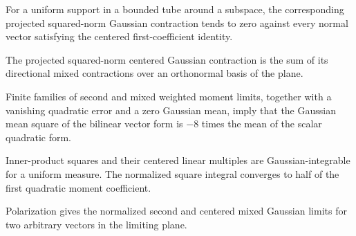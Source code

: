 \begin{lemma}
\label{lem:bounded-tube-projected-contraction}

For a uniform support in a bounded tube around a subspace, the corresponding projected squared-norm Gaussian contraction tends to zero against every normal vector satisfying the centered first-coefficient identity.
\end{lemma}

\begin{lemma}
\label{lem:projected-mixed-gaussian-sum}

The projected squared-norm centered Gaussian contraction is the sum of its directional mixed contractions over an orthonormal basis of the plane.
\end{lemma}

\begin{lemma}
\label{lem:gaussian-weighted-contraction}

Finite families of second and mixed weighted moment limits, together with a vanishing quadratic error and a zero Gaussian mean, imply that the Gaussian mean square of the bilinear vector form is $-8$ times the mean of the scalar quadratic form.
\end{lemma}

\begin{lemma}
\label{lem:gaussian-inner-product-limits}

Inner-product squares and their centered linear multiples are Gaussian-integrable for a uniform measure. The normalized square integral converges to half of the first quadratic moment coefficient.
\end{lemma}

\begin{lemma}
\label{lem:gaussian-cross-product-limits}

Polarization gives the normalized second and centered mixed Gaussian limits for two arbitrary vectors in the limiting plane.
\end{lemma}

